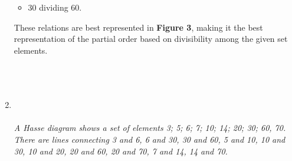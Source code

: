 \documentclass{amsart}
\theoremstyle{definition}
\theoremstyle{Exercise}
\theoremstyle{remark}
\theoremstyle{rule}
\numberwithin{equation}{section}
\begin{document}
\begin{enumerate}[label=(\alph{*})]
\begin{itemize}
				\item 30 dividing 60.
			\end{itemize}
			These relations are best represented in \textbf{Figure 3}, making it the best
			representation of the partial order based on divisibility among the given set
			elements. \\\\
			\newpage
			~\\~\\

		\item {} \\\\
			{\color{blue}{\bf Figure 4:} \emph{A Hasse diagram shows a set of elements {3; 5; 6; 7; 10; 14; 20; 30; 60, 70}. There are lines connecting 3 and 6, 6 and 30, 30 and 60, 5 and 10, 10 and 30, 10 and 20, 20 and 60, 20 and 70, 7 and 14, 14 and 70. } }
			\\ \\
			\\\\
			\newpage
			~\\~\\


\end{enumerate}
\end{document}
